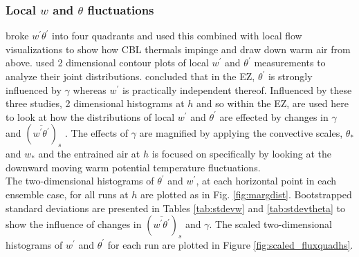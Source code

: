 \subsubsection{Local $w$ and $\theta$ fluctuations}
\label{subsubsec:locfluc}

\cite{SullMoengStev} broke $w^{'}\theta^{'}$ into four quadrants and used this combined with local flow visualizations to show how CBL thermals impinge and draw down warm air from above. \cite{MahrtPaum} used 2 dimensional contour plots of local $w^{'}$ and $\theta^{'}$ measurements to analyze their joint distributions.  \cite{Sorbjan1} concluded that in the EZ, $\theta^{'}$ is strongly influenced by $\gamma$  whereas $w^{'}$ is practically independent thereof.  Influenced by these three studies, 2 dimensional histograms at $h$ and so within the EZ, are used here to look at how the distributions of local $w^{'}$ and $\theta^{'}$ are effected by changes in $\gamma$ and $(\overline{w^{'}\theta^{'}})_{s}$ .  The effects of $\gamma$ are magnified by applying the convective scales, $\theta_{*}$ and $w_{*}$ and the entrained air at $h$ is focused on specifically by looking at the downward moving warm potential temperature fluctuations.\\    

The two-dimensional histograms of $\theta^{'}$ and $w^{'}$, at each horizontal point in each ensemble case, for all runs at $h$ are plotted as in Fig. \ref{fig:margdist}.  Bootstrapped standard deviations are presented in Tables \ref{tab:stdevw} and \ref{tab:stdevtheta} to show the influence of changes in $(\overline{w^{'} \theta^{'}})_{s}$ and $\gamma$.  The scaled two-dimensional histograms of $w^{'}$ and $\theta^{'}$ for each run are plotted in Figure \ref{fig:scaled_fluxquadhs}.\\

